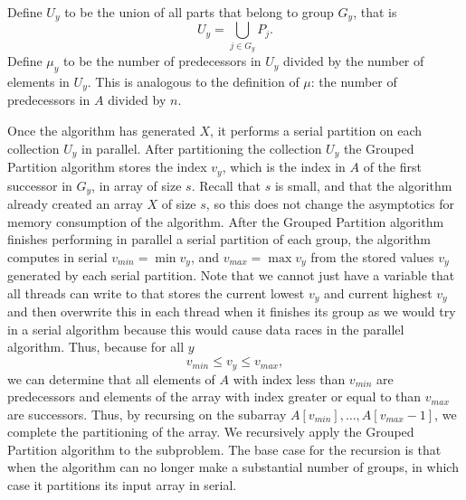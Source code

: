 \documentclass[twocolumn, twoside, 12pt]{article}
\begin{document}
Define $U_y$ to be the union of all parts that belong to group $G_y$, that is
$$U_y = \bigcup_{j\in G_y} P_j.$$
Define $\mu_y$ to be the number of predecessors in $U_y$ divided by the number of elements in $U_y$. This is analogous to the definition of $\mu$: the number of predecessors in $A$ divided by $n$.

Once the algorithm has generated $X$, it performs a serial partition on each collection $U_y$ in parallel. 
After partitioning the collection $U_y$ the Grouped Partition algorithm stores the index $v_y$, which is the index in $A$ of the first successor in $G_y$, in array of size $s$.
Recall that $s$ is small, and that the algorithm already created an array $X$ of size $s$, so this does not change the asymptotics for memory consumption of the algorithm.
After the Grouped Partition algorithm finishes performing in parallel a serial partition of each group, the algorithm computes in serial $v_{min} =\min v_y$, and $v_{max} = \max{v_y}$ from the stored values $v_y$ generated by each serial partition.
Note that we cannot just have a variable that all threads can write to that stores the current lowest $v_y$ and current highest $v_y$ and then overwrite this in each thread when it finishes its group as we would try in a serial algorithm because this would cause data races in the parallel algorithm.
Thus, because for all $y$ 
$$v_{min}\leq v_{y} \leq v_{max},$$
we can determine that all elements of $A$ with index less than $v_{min}$ are predecessors and elements of the array with index greater or equal to than $v_{max}$ are successors.
Thus, by recursing on the subarray $A[v_{min}],\ldots,A[v_{max}-1]$, we complete the partitioning of the array.
We recursively apply the Grouped Partition algorithm to the subproblem.
The base case for the recursion is that when the algorithm can no longer make a substantial number of groups, in which case it partitions its input array in serial.
\end{document}
